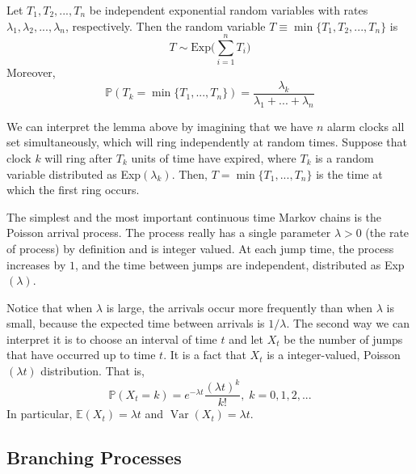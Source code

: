 \documentclass{article}
\DeclareMathOperator{\Var}{Var}
\begin{document}
    \begin{lemma}
      Let $T_1, T_2, ..., T_n$ be independent exponential random variables with rates $\lambda_1, \lambda_2, ..., \lambda_n$, respectively. Then the random variable $T \equiv \min\{T_1, T_2, ..., T_n\}$ is
      \begin{equation}
        T \sim \text{Exp}\Big(\sum_{i=1}^n T_i\Big)
      \end{equation}
      Moreover, 
      \begin{equation}
        \mathbb{P}(T_k = \min\{T_1, ..., T_n\}) = \frac{\lambda_k}{\lambda_1 + ... + \lambda_n}
      \end{equation}
    \end{lemma}

    We can interpret the lemma above by imagining that we have $n$ alarm clocks all set simultaneously, which will ring independently at random times. Suppose that clock $k$ will ring after $T_k$ units of time have expired, where $T_k$ is a random variable distributed as Exp$(\lambda_k)$. Then, $T = \min\{T_1, ..., T_n\}$ is the time at which the first ring occurs. 

    \begin{example}
      The simplest and the most important continuous time Markov chains is the Poisson arrival process. The process really has a single parameter $\lambda >0$ (the rate of process) by definition and is integer valued. At each jump time, the process increases by $1$, and the time between jumps are independent, distributed as Exp$(\lambda)$. 

      Notice that when $\lambda$ is large, the arrivals occur more frequently than when $\lambda$ is small, because the expected time between arrivals is $1/\lambda$. The second way we can interpret it is to choose an interval of time $t$ and let $X_t$ be the number of jumps that have occurred up to time $t$. It is a fact that $X_t$ is a integer-valued, Poisson$(\lambda t)$ distribution. That is, 
      \begin{equation}
        \mathbb{P}(X_t = k) = e^{-\lambda t} \frac{(\lambda t)^k}{k!}, \; k = 0, 1, 2, ...
      \end{equation}
      In particular, $\mathbb{E}(X_t) = \lambda t$ and $\Var(X_t) = \lambda t$. 
    \end{example}

  \subsection{Branching Processes}
\end{document}
